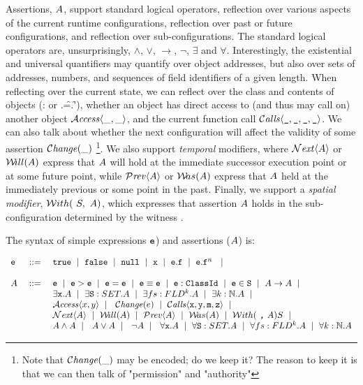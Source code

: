 Assertions, $A$, support standard logical operators, 
reflection over various aspects of the current 
runtime configurations, reflection over past or future configurations, and 
reflection over sub-configurations.
The standard logical operators are, unsurprisingly,
 $\wedge$, $\vee$, $\rightarrow$, $\neg$, $\exists$ and $\forall$.
Interestingly, the existential and universal quantifiers may quantify over object addresses, but also 
over sets of addresses, numbers, and sequences of field identifiers of a given length.
When reflecting over the current state, we can reflect over the class and contents of objects
(\eg \x: or \x.\f=\y.\f'), whether an
object has direct access to (and thus may call on) another object ${\mathcal{A}}\textrm{\textit{ccess}}\langle \_,\_\rangle$,
and the current function call ${\mathcal{C}}\textrm{\textit{alls}}\langle {\mbox{\tt{\_}}},{\mbox{\tt{\_}}},{\mbox{\tt{\_}}},{\mbox{\tt{\_}}}\rangle$.
We can also talk about whether the next configuration will affect the 
validity of some assertion $\mathcal{C}\textrm{\textit{hange}}(\_)$
\footnote{Note that $\mathcal{C}\textrm{\textit{hange}}(\_)$ may be encoded; do we keep it?
The reason to keep it is that we can then talk of "permission" and "authority" }.  
We also support {\em temporal} modifiers, where ${\mathcal{N}}\textrm{\textit{ext}}\langle A\rangle$ or ${{\mathcal W}\!ill}(A)$  express  that $A$ will hold at
the immediate successor execution point or at some future point, while
${\mathcal{P}}\textrm{\textit{rev}}\langle A\rangle$ or ${{\mathcal W}\!as}(A)$ express  that $A$ held at the immediately previous or
some point in the past.
Finally, we support a {\em spatial modifier}, ${\mathcal W}ith(\ S,\ A)$, 
which expresses that assertion $A$ holds in
the sub-configuration determined by the witness .


\begin{definition}[Assertions] The syntax of simple expressions ${\mbox{\tt{e}}}$) and assertions ($A$) is:
\label{def:assertions}

 $\begin{array}{lcl}
  {\mbox{\tt{e}}} & ::= &  {\mbox{\tt{true}}}  \ \mid\ {\mbox{\tt{false}}}  \    \mid\ {\mbox{\tt{null}}}  \ \mid \ {\mbox{\tt{x}}}  \ \mid \ {\mbox{\tt{e}}}.{\mbox{\tt{f}}}    \ \mid \ {\mbox{\tt{e}}}.{\mbox{\tt{f}}}^n \   \ \mid\  \ \\
 ~ \\
A &\ ::=\  &   {\mbox{\tt{e}}}  \ \mid \ {\mbox{\tt{e}}} > {\mbox{\tt{e}}} \ \mid \  {\mbox{\tt{e}}}={\mbox{\tt{e}}}  \ \mid \ {\mbox{\tt{e}}} \equiv {\mbox{\tt{e}}}\ \mid \   {\mbox{\tt{e}}}:{\mbox{\tt{ClassId}}}  \ \mid \
    {\mbox{\tt{e}}}\in{\mbox{\tt{S}}}   \ \mid  \ A \rightarrow A  \ \mid\  \  \\
 &   &  \exists {\mbox{\tt{x}}}.A  \ \mid \  \exists {\mbox{\tt{S}}}:SET.A  \ \mid \  \exists fs:FLD^k.A
 \ \mid \  \exists k:\mathbb{N}.A  \ \mid\  \
\\
 &    & {\mathcal{A}}\textrm{\textit{ccess}}\langle x,y\rangle \ \mid\  \ \mathcal{C}\textrm{\textit{hange}}(e) \ \mid\  {\mathcal{C}}\textrm{\textit{alls}}\langle {\mbox{\tt{x}}},{\mbox{\tt{y}}},{\mbox{\tt{m}}},{\mbox{\tt{z}}}\rangle \ \mid\  \\  
 &    &  {\mathcal{N}}\textrm{\textit{ext}}\langle A\rangle  \ \mid \   {{\mathcal W}\!ill}(A) \ \mid \  {\mathcal{P}}\textrm{\textit{rev}}\langle A\rangle    \ \mid \  {{\mathcal W}\!as}(A) \ \mid \ {\mathcal W}ith(\ {\mbox{\tt{,}}}\ A){S }  \ \mid\  \
 \\
  &   &  A \wedge A  \ \mid\  \ A \vee A  \ \mid\  \ \neg A   \ \mid\  \ \forall {\mbox{\tt{x}}}.A  \ \mid \  \forall {\mbox{\tt{S}}}:SET.A  \ \mid \  \forall fs:FLD^k.A
 \ \mid \  \forall k:\mathbb{N}.A
\end{array}$


\end{definition}


